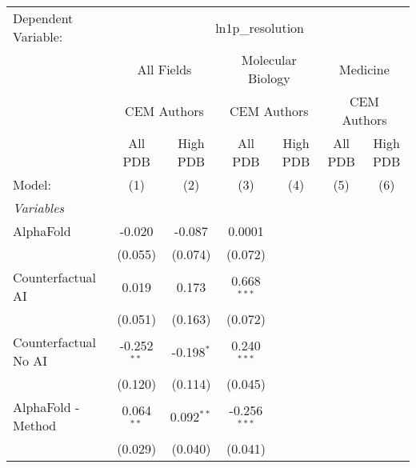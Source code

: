 \begingroup
\centering
\begin{tabular}{lcccccc}
   \tabularnewline \midrule \midrule
   Dependent Variable: & \multicolumn{6}{c}{ln1p\_resolution}\\
 & \multicolumn{2}{c}{All Fields} & \multicolumn{2}{c}{Molecular Biology} & \multicolumn{2}{c}{Medicine} \\
\cmidrule(lr){2-3} \cmidrule(lr){4-5} \cmidrule(lr){6-7}
 & \multicolumn{2}{c}{CEM Authors} & \multicolumn{2}{c}{CEM Authors} & \multicolumn{2}{c}{CEM Authors} \\
\cmidrule(lr){2-3} \cmidrule(lr){4-5} \cmidrule(lr){6-7}
 & \multicolumn{1}{c}{All PDB} & \multicolumn{1}{c}{High PDB} & \multicolumn{1}{c}{All PDB} & \multicolumn{1}{c}{High PDB} & \multicolumn{1}{c}{All PDB} & \multicolumn{1}{c}{High PDB} \\
\cmidrule(lr){2-2} \cmidrule(lr){3-3} \cmidrule(lr){4-4} \cmidrule(lr){5-5} \cmidrule(lr){6-6} \cmidrule(lr){7-7}
   Model:                                                     & (1)            & (2)          & (3)            & (4) & (5) & (6)\\  
   \midrule
   \emph{Variables}\\
   AlphaFold                                                  & -0.020         & -0.087       & 0.0001         &     &     &   \\   
                                                              & (0.055)        & (0.074)      & (0.072)        &     &     &   \\   
   Counterfactual AI                                          & 0.019          & 0.173        & 0.668$^{***}$  &     &     &   \\   
                                                              & (0.051)        & (0.163)      & (0.072)        &     &     &   \\   
   Counterfactual No AI                                       & -0.252$^{**}$  & -0.198$^{*}$ & 0.240$^{***}$  &     &     &   \\   
                                                              & (0.120)        & (0.114)      & (0.045)        &     &     &   \\   
   AlphaFold - Method                                         & 0.064$^{**}$   & 0.092$^{**}$ & -0.256$^{***}$ &     &     &   \\   
                                                              & (0.029)        & (0.040)      & (0.041)        &     &     &   \\   

\end{tabular}
